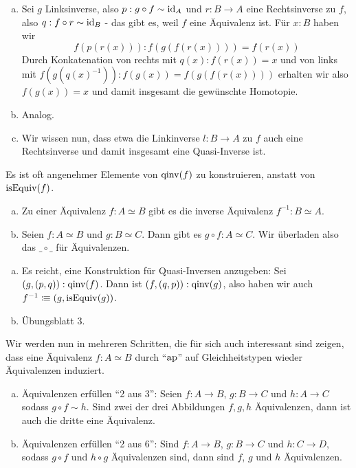 \begin{beweis}
  \begin{enumerate}[(a)]
  \item Sei $g$ Linksinverse, also $p:g\circ f\sim \mathrm{id}_A$ und $r:B\to A$ eine Rechtsinverse zu $f$, also $q:f\circ r\sim\mathrm{id}_B$ - das gibt es, weil $f$ eine Äquivalenz ist.
    Für $x:B$ haben wir \[
    f(p(r(x))):f(g(f(r(x))))=f(r(x))
    \]
    Durch Konkatenation von rechts mit $q(x):f(r(x))=x$ und von links mit $f(g(q(x)^{-1})):f(g(x))=f(g(f(r(x))))$ erhalten wir also $f(g(x))=x$ und damit insgesamt die gewünschte Homotopie.
  \item Analog.
  \item Wir wissen nun, dass etwa die Linkinverse $l:B\to A$ zu $f$ auch eine Rechtsinverse und damit insgesamt eine Quasi-Inverse ist.
  \end{enumerate}
\end{beweis}

Es ist oft angenehmer Elemente von $\mathrm{qinv}(f)$ zu konstruieren, anstatt von $\mathrm{isEquiv}(f)$.

\begin{lemma}
  \begin{enumerate}[(a)]
  \item Zu einer Äquivalenz $f:A\simeq B$ gibt es die inverse Äquivalenz $f^{-1}:B\simeq A$.
  \item Seien $f:A\simeq B$ und $g:B\simeq C$. Dann gibt es $g\circ f:A\simeq C$. Wir überladen also das $\_\circ\_$ für Äquivalenzen.
  \end{enumerate}
\end{lemma}

\begin{beweis}
  \begin{enumerate}[(a)]
  \item Es reicht, eine Konstruktion für Quasi-Inversen anzugeben: Sei $(g,(p,q)):\mathrm{qinv}(f)$.
    Dann ist $(f,(q,p)):\mathrm{qinv}(g)$, also haben wir auch $f^{-1}\vcentcolon\mspace{-1.2mu}\equiv (g,\mathrm{isEquiv}(g))$.
  \item Übungsblatt 3.
  \end{enumerate}
\end{beweis}

Wir werden nun in mehreren Schritten, die für sich auch interessant sind zeigen,
dass eine Äquivalenz $f:A\simeq B$ durch ``$\mathrm{ap}$'' auf Gleichheitstypen wieder Äquivalenzen induziert.

\begin{lemma}
   \label{2-6}
  \begin{enumerate}[(a)]
  \item Äquivalenzen erfüllen ``2 aus 3'':
    Seien $f:A\to B$, $g:B\to C$ und $h:A\to C$
    sodass $g\circ f\sim h$.
    Sind zwei der drei Abbildungen $f,g,h$ Äquivalenzen, dann ist auch die dritte eine Äquivalenz.
  \item Äquivalenzen erfüllen ``2 aus 6'':
    Sind $f:A\to B$, $g:B\to C$ und $h:C\to D$, sodass $g\circ f$ und $h\circ g$ Äquivalenzen sind,
    dann sind $f$, $g$ und $h$ Äquivalenzen.
  \end{enumerate}
\end{lemma}

